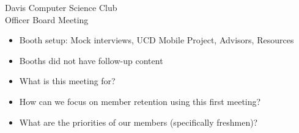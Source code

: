 \documentclass{article}
\begin{document}
\begin{Minutes}{Davis Computer Science Club\\Officer Board Meeting}

	






\maketitle



\begin{itemize}
	\item Booth setup: Mock interviews, UCD Mobile Project, Advisors, Resources
	\item Booths did not have follow-up content
\end{itemize}


\begin{itemize}
	\item What is this meeting for?
	\item How can we focus on member retention using this first meeting?
	\item What are the priorities of our members (specifically freshmen)?
\end{itemize}



\end{Minutes}
\end{document}
